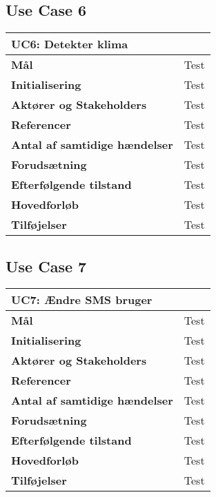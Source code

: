 \subsection{Use Case 6}
\begin{table}[H] \centering
\begin{tabular}{|p{6cm}|p{8cm}|}
	\hline
\multicolumn{2}{|l|}{\textbf{UC6: Detekter klima}} \\\hline
\textbf{Mål}								&Test \\\hline
\textbf{Initialisering}					&Test \\\hline
\textbf{Aktører og Stakeholders}			&Test \\\hline
\textbf{Referencer}						&Test \\\hline
\textbf{Antal af samtidige hændelser}	&Test \\\hline
\textbf{Forudsætning}					&Test \\\hline
\textbf{Efterfølgende tilstand}			&Test \\\hline
\textbf{Hovedforløb}						&Test \\\hline
\textbf{Tilføjelser}						&Test \\\hline
	\end{tabular}
	\label{UC6} 
\end{table}

\subsection{Use Case 7}
\begin{table}[H] \centering
\begin{tabular}{|p{6cm}|p{8cm}|}
	\hline
\multicolumn{2}{|l|}{\textbf{UC7: Ændre SMS bruger}} \\\hline
\textbf{Mål}								&Test \\\hline
\textbf{Initialisering}					&Test \\\hline
\textbf{Aktører og Stakeholders}			&Test \\\hline
\textbf{Referencer}						&Test \\\hline
\textbf{Antal af samtidige hændelser}	&Test \\\hline
\textbf{Forudsætning}					&Test \\\hline
\textbf{Efterfølgende tilstand}			&Test \\\hline
\textbf{Hovedforløb}						&Test \\\hline
\textbf{Tilføjelser}						&Test \\\hline
	\end{tabular}
	\label{UC7} 
\end{table}
